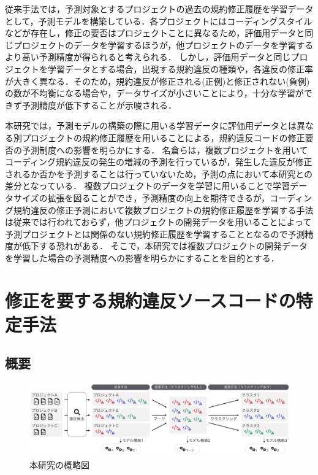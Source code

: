 \documentclass[submit,noauthor,dvipdfmx]{ipsj}
\begin{document}
従来手法では，予測対象とするプロジェクトの過去の規約修正履歴を学習データとして，予測モデルを構築している．各プロジェクトにはコーディングスタイルなどが存在し，修正の要否はプロジェクトことに異なるため，評価用データと同じプロジェクトのデータを学習するほうが，他プロジェクトのデータを学習するより高い予測精度が得られると考えられる．
しかし，評価用データと同じプロジェクトを学習データとする場合，出現する規約違反の種類や，各違反の修正率が大きく異なる\cite{Panichella}．そのため，規約違反が修正される(正例)と修正されない(負例)の数が不均衡になる場合や，データサイズが小さいことにより，十分な学習ができず予測精度が低下することが示唆される．

本研究では，予測モデルの構築の際に用いる学習データに評価用データとは異なる別プロジェクトの規約修正履歴を用いることによる，規約違反コードの修正要否の予測制度への影響を明らかにする．
名倉らは，複数プロジェクトを用いてコーディング規約違反の発生の増減の予測を行っているが，発生した違反が修正されるか否かを予測することは行っていないため，予測の点において本研究との差分となっている\cite{nagura}．
複数プロジェクトのデータを学習に用いることで学習データサイズの拡張を図ることができ，予測精度の向上を期待できるが，コーディング規約違反の修正予測において複数プロジェクトの規約修正履歴を学習する手法は従来では行われておらず，他プロジェクトの開発データを用いることによって予測プロジェクトとは関係のない規約修正履歴を学習することとなるので予測精度が低下する恐れがある．
そこで，本研究では複数プロジェクトの開発データを学習した場合の予測精度への影響を明らかにすることを目的とする．


\section{修正を要する規約違反ソースコードの特定手法}\label{chap:approach}

\subsection{概要}

\begin{figure}[t]
	\centering
	\includegraphics[width=0.5\linewidth]{Kameoka_fig/kameoka_fig1.pdf}
	\caption{本研究の概略図}
	\label{fig:Teiannsyuhou}
\end{figure}
\end{document}
